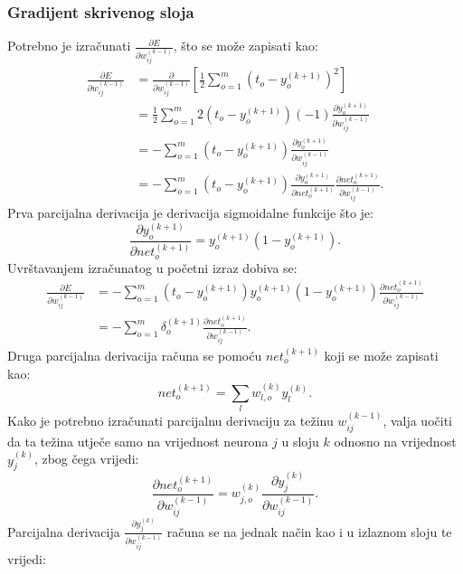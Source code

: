 \documentclass[times, utf8, zavrsni, numeric]{fer}
\begin{document}
\subsubsection{Gradijent skrivenog sloja}
Potrebno je izračunati $\frac{\partial E}{\partial w_{ij}^{(k-1)}}$, što se može zapisati kao:
\begin{equation*}
\begin{split}
    \frac{\partial E}{\partial w_{ij}^{(k-1)}}
        & = \frac{\partial}{\partial w_{ij}^{(k-1)}} 
        \left[\frac{1}{2}\displaystyle\sum_{o = 1}^m(t_o - y_o^{(k + 1)})^2\right]\\
        & = \frac{1}{2} \displaystyle\sum_{o = 1}^m2(t_o - y_o^{(k + 1)})(-1) \frac{\partial y_o^{(k + 1)}}{\partial w_{ij}^{(k-1)}} \\
        & = -\displaystyle\sum_{o = 1}^m(t_o - y_o^{(k + 1)})\frac{\partial y_o^{(k + 1)}}{\partial w_{ij}^{(k-1)}}\\
        & = -\displaystyle\sum_{o = 1}^m(t_o - y_o^{(k + 1)})\frac{\partial y_o^{(k + 1)}}{\partial net_{o}^{(k+1)}}\frac{\partial net_o^{(k + 1)}}{\partial w_{ij}^{(k-1)}}.
\end{split}
\end{equation*}
Prva parcijalna derivacija je derivacija sigmoidalne funkcije što je:
\[
    \frac{\partial y_o^{(k + 1)}}{\partial net_{o}^{(k+1)}}
    = y_o^{(k + 1)} (1 - y_o^{(k + 1)}).
\]
Uvrštavanjem izračunatog u početni izraz dobiva se:
\begin{equation*}
\begin{split}
    \frac{\partial E}{\partial w_{ij}^{(k-1)}}
        & = -\displaystyle\sum_{o = 1}^m(t_o - y_o^{(k + 1)})y_o^{(k + 1)} (1 - y_o^{(k + 1)})\frac{\partial net_o^{(k + 1)}}{\partial w_{ij}^{(k-1)}}\\
        & = -\displaystyle\sum_{o = 1}^m\delta_o^{(k+1)}\frac{\partial net_o^{(k + 1)}}{\partial w_{ij}^{(k-1)}}.
\end{split}
\end{equation*}
Druga parcijalna derivacija računa se pomoću $net_o^{(k + 1)}$ koji se može zapisati kao:
\[
    net_o^{(k + 1)} = \displaystyle\sum_l w_{l,o}^{(k)}y_l^{(k)}.
\]
Kako je potrebno izračunati parcijalnu derivaciju za težinu $w_{ij}^{(k-1)}$, valja uočiti da ta težina utječe samo na vrijednost neurona $j$ u sloju $k$ odnosno na vrijednost $y_j^{(k)}$, zbog čega vrijedi:
\[
    \frac{\partial net_o^{(k + 1)}}{\partial w_{ij}^{(k-1)}}
    = w_{j,o}^{(k)}\frac{\partial y_j^{(k)}}{\partial w_{ij}^{(k-1)}}.
\]
Parcijalna derivacija $\frac{\partial y_j^{(k)}}{\partial w_{ij}^{(k-1)}}$ računa se na jednak način kao i u izlaznom sloju te vrijedi:
\end{document}
